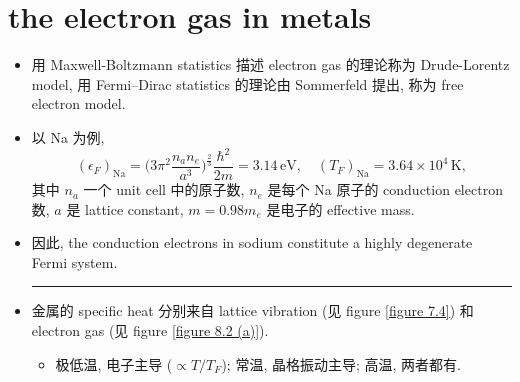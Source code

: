 \section{the electron gas in metals} \label{8.3}
\begin{itemize}
	\item 用 Maxwell-Boltzmann statistics 描述 electron gas 的理论称为 Drude-Lorentz model, 用 Fermi--Dirac statistics 的理论由 Sommerfeld 提出, 称为 free electron model.
	
	\item 以 Na 为例,
	\begin{equation}
		(\epsilon_F)_\text{Na} = \Big( 3 \pi^2 \frac{n_a n_e}{a^3} \Big)^{\frac{2}{3}} \frac{\hbar^2}{2 m} = 3.14 \, \text{eV}, \quad (T_F)_\text{Na} = 3.64 \times 10^4 \, \text{K},
	\end{equation}
	其中 $n_a$ 一个 unit cell 中的原子数, $n_e$ 是每个 Na 原子的 conduction electron 数, $a$ 是 lattice constant, $m = 0.98 m_e$ 是电子的 effective mass.
	
	\item 因此, the conduction electrons in sodium constitute a highly degenerate Fermi system.
	
	\noindent\rule[0.5ex]{\linewidth}{0.5pt} %
	
	\item 金属的 specific heat 分别来自 lattice vibration (见 figure \ref{figure 7.4}) 和 electron gas (见 figure \ref{figure 8.2 (a)}).
	\begin{itemize}
		\item 极低温, 电子主导 ($\propto T / T_F$); 常温, 晶格振动主导; 高温, 两者都有.
	\end{itemize}
\end{itemize}

